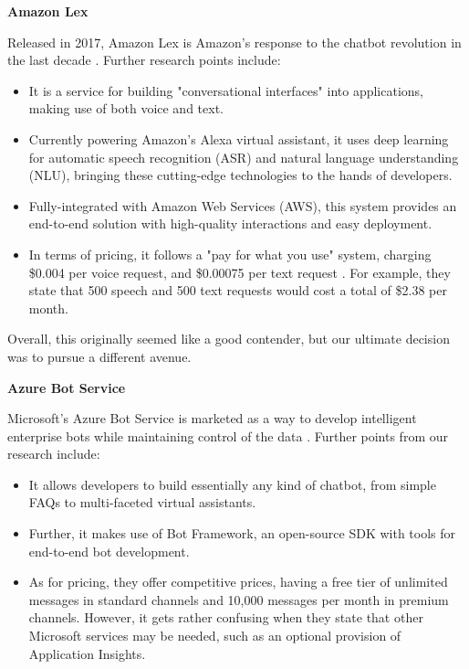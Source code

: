 \documentclass[titlepage, 12pt]{article}
\begin{document}
\textbf{Amazon Lex}

Released in 2017, Amazon Lex is Amazon's response to the chatbot revolution in the last decade \cite{bib-2-14}. Further research points include:

\begin{itemize}
    \item It is a service for building "conversational interfaces" into applications, making use of both voice and text.
    \item Currently powering Amazon's Alexa virtual assistant, it uses deep learning for automatic speech recognition (ASR) and natural language understanding (NLU), bringing these cutting-edge technologies to the hands of developers.
    \item Fully-integrated with Amazon Web Services (AWS), this system provides an end-to-end solution with high-quality interactions and easy deployment.
    \item In terms of pricing, it follows a "pay for what you use" system, charging \$0.004 per voice request, and \$0.00075 per text request \cite{bib-2-15}. For example, they state that 500 speech and 500 text requests would cost a total of \$2.38 per month.
\end{itemize}
 
Overall, this originally seemed like a good contender, but our ultimate decision was to pursue a different avenue.

\textbf{Azure Bot Service}

Microsoft's Azure Bot Service is marketed as a way to develop intelligent enterprise bots while maintaining control of the data \cite{bib-2-16}. Further points from our research include:

\begin{itemize}
    \item It allows developers to build essentially any kind of chatbot, from simple FAQs to multi-faceted virtual assistants.
    \item Further, it makes use of Bot Framework, an open-source SDK with tools for end-to-end bot development.
    \item As for pricing, they offer competitive prices, having a free tier of unlimited messages in standard channels and 10,000 messages per month in premium channels. However, it gets rather confusing when they state that other Microsoft services may be needed, such as an optional provision of Application Insights.
\end{itemize}
\end{document}
